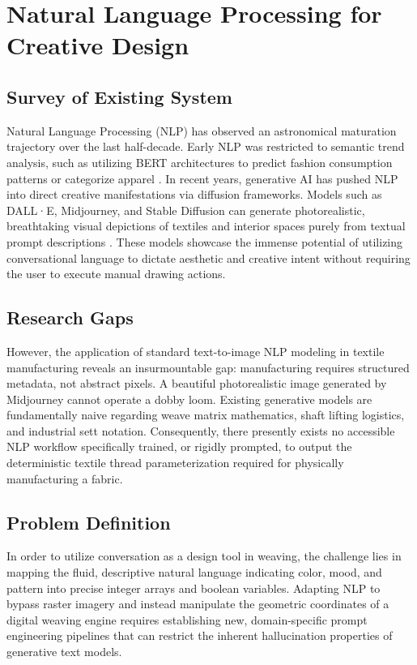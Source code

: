 \section{Natural Language Processing for Creative Design}

\subsection{Survey of Existing System}
Natural Language Processing (NLP) has observed an astronomical maturation trajectory over the last half-decade. Early NLP was restricted to semantic trend analysis, such as utilizing BERT architectures to predict fashion consumption patterns or categorize apparel \cite{ref3}. In recent years, generative AI has pushed NLP into direct creative manifestations via diffusion frameworks. Models such as DALL·E, Midjourney, and Stable Diffusion can generate photorealistic, breathtaking visual depictions of textiles and interior spaces purely from textual prompt descriptions \cite{ref4}. These models showcase the immense potential of utilizing conversational language to dictate aesthetic and creative intent without requiring the user to execute manual drawing actions.

\subsection{Research Gaps}
However, the application of standard text-to-image NLP modeling in textile manufacturing reveals an insurmountable gap: manufacturing requires structured metadata, not abstract pixels. A beautiful photorealistic image generated by Midjourney cannot operate a dobby loom. Existing generative models are fundamentally naive regarding weave matrix mathematics, shaft lifting logistics, and industrial sett notation. Consequently, there presently exists no accessible NLP workflow specifically trained, or rigidly prompted, to output the deterministic textile thread parameterization required for physically manufacturing a fabric.

\subsection{Problem Definition}
In order to utilize conversation as a design tool in weaving, the challenge lies in mapping the fluid, descriptive natural language indicating color, mood, and pattern into precise integer arrays and boolean variables. Adapting NLP to bypass raster imagery and instead manipulate the geometric coordinates of a digital weaving engine requires establishing new, domain-specific prompt engineering pipelines that can restrict the inherent hallucination properties of generative text models.

